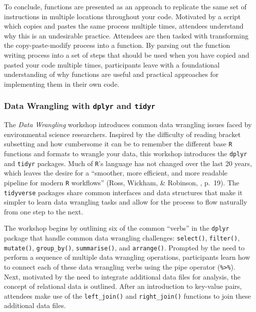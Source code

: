 \documentclass[12pt]{article}
\begin{document}
To conclude, functions are presented as an approach to replicate the same set of instructions
in multiple locations throughout your code. Motivated by a script which copies 
and pastes the same process multiple times, attendees understand why this is 
an undesirable practice. Attendees are then tasked with transforming the
copy-paste-modify process into a function. By parsing out the function writing
process into a set of steps that should be used when you have copied and pasted
your code multiple times, participants leave with a foundational understanding
of why functions are useful and practical approaches for implementing them in
their own code.

\subsubsection{Data Wrangling with \texttt{dplyr} and \texttt{tidyr}}
\label{sec:wrangle}

\quad The \emph{Data Wrangling} workshop introduces common data wrangling issues
faced by environmental science researchers. Inspired by the difficulty of
reading bracket subsetting and how cumbersome it can be to remember the
different base \texttt{R} functions and formats to wrangle your data, this
workshop introduces the \texttt{dplyr} \citep{dplyr} and \texttt{tidyr} 
\citep{tidyr} packages. Much of \texttt{R}'s language has not changed over the
last 20 years, which leaves the desire for a ``smoother, more efficient, and
more readable pipeline for modern \texttt{R} workflows'' (Ross, Wickham, 
\& Robinson, \citeyear{tidytools}, p.\ 19). The \texttt{tidyverse} packages
share common interfaces and data structures that make it simpler to learn data
wrangling tasks and allow for the process to flow naturally from one step to the
next. 


\quad The workshop begins by outlining six of the common ``verbs''
in the \texttt{dplyr} package that handle
common data wrangling challenges: 
\texttt{select()}, \texttt{filter()}, \texttt{mutate()}, \texttt{group\_by()},
\texttt{summarise()}, and \texttt{arrange()}. Prompted by the need to perform a
sequence of multiple data wrangling operations, participants learn how to
connect each of these data wrangling verbs using the pipe operator 
(\texttt{\%>\%}). Next, motivated by the need to integrate additional data files
for analysis, the concept of relational data is outlined. After an introduction 
to key-value pairs, attendees make use of the \texttt{left\_join()} and 
\texttt{right\_join()} functions to join these additional data files. 
\end{document}
